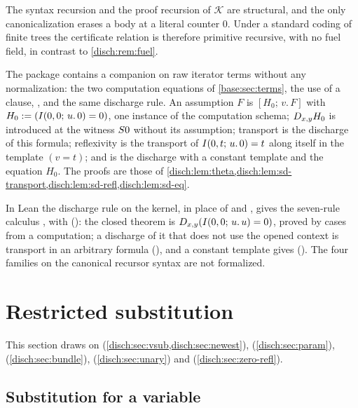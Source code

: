 \begin{remark}
\label{disch:rem:sd}
The syntax recursion and the proof recursion of $\mathcal K$ are
structural, and the only canonicalization erases a body at a literal
counter $0$. Under a standard coding of finite trees the certificate
relation is therefore primitive recursive, with no fuel field, in contrast
to \cref{disch:rem:fuel}.

The package contains a companion on raw iterator terms without any
normalization: the two computation equations of \cref{base:sec:terms}, the
use of a clause, , and the same discharge rule. An
assumption $F$ is $[H_0;\,v.\,F]$ with
$H_0\mathrel{:=}(I(0,0;\,u.\,0)=0)$, one instance of the computation schema;
$D_{x,y}H_0$ is introduced at the witness $S 0$ without its
assumption; transport is the discharge of this formula; reflexivity is the
transport of $I(0,t;\,u.\,0)=t$ along itself in the template $(v=t)$; and
 is the discharge with a constant template and the equation
$H_0$. The proofs are those of
\cref{disch:lem:theta,disch:lem:sd-transport,disch:lem:sd-refl,disch:lem:sd-eq}.

In Lean the discharge rule on the kernel, in place of  and
, gives the seven-rule calculus , with
 (): the closed
theorem is $D_{x,y}(I(0,0;\,u.\,u)=0)$, proved by cases from a
computation; a discharge of it that does not use the opened context is
transport in an arbitrary formula (), and a constant
template gives  (). The four families on the
canonical recursor syntax are not formalized.
\end{remark}

\section{Restricted substitution}
\label{disch:sec:restricted}

This section draws on 
(\cref{disch:sec:vsub,disch:sec:newest}), 
(\cref{disch:sec:param}), 
(\cref{disch:sec:bundle}), 
(\cref{disch:sec:unary}) and 
(\cref{disch:sec:zero-refl}).

\subsection{Substitution for a variable}
\label{disch:sec:vsub}

